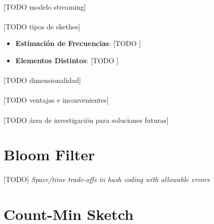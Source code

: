 \documentclass{subfiles}
\begin{document}
        \paragraph{}
        [TODO modelo streaming]

        \paragraph{}
        [TODO tipos de skethes]

        \begin{itemize}

          \item \textbf{Estimación de Frecuencias}: [TODO ]

          \item \textbf{Elementos Distintos}: [TODO ]

        \end{itemize}

        \paragraph{}
        [TODO dimensionalidad]


        \paragraph{}
        [TODO ventajas e inconvenientes]

        \paragraph{}
        [TODO área de investigación para soluciones futuras]


    \section{Bloom Filter}
    \label{sec:bloom_filter}

      \paragraph{}
      [TODO] \emph{Space/time trade-offs in hash coding with allowable errors} \cite{bloom1970space}


    \section{Count-Min Sketch}
    \label{sec:count_min_sketch}
\end{document}
